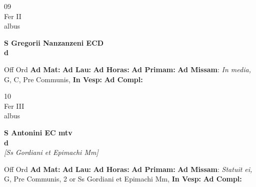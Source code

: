 \documentclass[10pt, openany]{book}
\begin{document}
        \begin{center}
            \begin{minipage}{3.5in}
                \vspace{2em}
                \begin{minipage}{0.5in}
                    {\Huge 09} \\
                    {\normalsize Fer II} \\
                    {\normalsize albus}
                \end{minipage}
                \begin{minipage}{3.0in}
                    \textbf{ \large S Gregorii Nanzanzeni ECD \\
                    \textnormal{\normalsize d}} \\ 
                \end{minipage}
                \begin{justify}Off Ord
                    \textbf{Ad Mat: }
                    \textbf{Ad Lau: }
                    \textbf{Ad Horas: }
                    \textbf{Ad Primam: }\textbf{Ad Missam}: \textit{In media,} G, C, Pre Communis,  
                    \textbf{In Vesp: }
                    \textbf{Ad Compl: }
                \end{justify}
            \end{minipage}
        \end{center}
    
        \begin{center}
            \begin{minipage}{3.5in}
                \vspace{2em}
                \begin{minipage}{0.5in}
                    {\Huge 10} \\
                    {\normalsize Fer III} \\
                    {\normalsize albus}
                \end{minipage}
                \begin{minipage}{3.0in}
                    \textbf{ \large S Antonini EC mtv \\
                    \textnormal{\normalsize d}} \\ \textit{[Ss Gordiani et Epimachi Mm]} \\ 
                \end{minipage}
                \begin{justify}Off Ord
                    \textbf{Ad Mat: }
                    \textbf{Ad Lau: }
                    \textbf{Ad Horas: }
                    \textbf{Ad Primam: }\textbf{Ad Missam}: \textit{Statuit ei,} G, Pre Communis, 2 or Ss Gordiani et Epimachi Mm,  
                    \textbf{In Vesp: }
                    \textbf{Ad Compl: }
                \end{justify}
            \end{minipage}
        \end{center}
    
\end{document}
